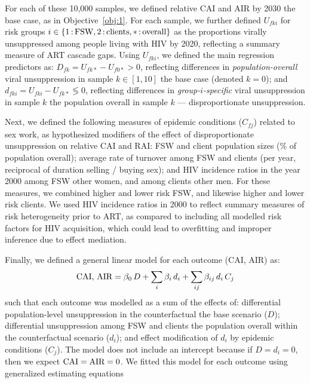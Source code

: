 \par
For each of these 10,000 samples, we defined
relative CAI and AIR by 2030 \vs the base case, as in Objective~\ref{obj:1}.
For each sample, we further defined
$U_{fki}$ for risk groups $i \in \{1{\,:\,}\textnormal{FSW}, 2{\,:\,}\textnormal{clients}, *{\,:\,}\textnormal{overall}\}$
as the proportions virally unsuppressed among people living with HIV by 2020,
reflecting a summary measure of ART cascade gaps.
Using $U_{fki}$, we defined the main regression predictors as:
$D_{fk} = U_{fk*} - U_{f0*} > 0$, reflecting differences in
\emph{population-overall} viral unsuppression in sample $k \in [1,10]$
\vs the base case (denoted $k = 0$); and
$d_{fki} = U_{fki} - U_{fk*} \lessgtr 0$, reflecting differences in
\emph{group-$i$-specific} viral unsuppression in sample $k$
\vs the population overall in sample $k$ --- \ie disproportionate unsuppression.
\par
Next, we defined the following measures of epidemic conditions ($C_{fj}$) related to sex work,
as hypothesized modifiers of the effect of disproportionate unsuppression on relative CAI and RAI:
FSW and client population sizes (\% of population overall);
average rate of turnover among FSW and clients (per year, reciprocal of duration selling / buying sex); and
HIV incidence ratios in the year 2000 among FSW \vs other women, and among clients \vs other men.
For these measures, we combined higher and lower risk FSW, and likewise higher and lower risk clients.
We used HIV incidence ratios in 2000 to reflect summary measures of risk heterogeneity prior to ART,
as compared to including all modelled risk factors for HIV acquisition,
which could lead to overfitting and improper inference due to effect mediation.
\par
Finally, we defined a general linear model for each outcome (CAI, AIR) as:
\begin{equation}\label{eq:obj.2.glm}
  \textnormal{CAI, AIR} = \beta_0\,D
                 + \sum_i \beta_i\,d_i
                 + \sum_{ij} \beta_{ij}\,d_i\,C_j
\end{equation}
such that each outcome was modelled as a sum of the effects of:
differential population-level unsuppression in the counterfactual \vs the base scenario ($D$);
differential unsuppression among FSW and clients
\vs the population overall within the counterfactual scenario ($d_i$); and
effect modification of $d_i$ by epidemic conditions ($C_j$).
The model does not include an intercept because if $D = d_i = 0$,
then we expect $\textnormal{CAI} = \textnormal{AIR} = 0$.
We fitted this model for each outcome using generalized estimating equations \cite{Hojsgaard2006}
